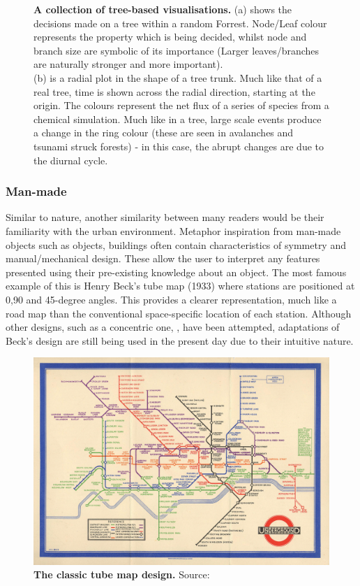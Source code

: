 \begin{figure}[H]
        \caption{\textbf{A collection of tree-based visualisations.}
         (a) shows the decisions made on a tree within a random Forrest. Node/Leaf colour represents the property which is being decided, whilst node and branch size are symbolic of its importance (Larger leaves/branches are naturally stronger and more important).\\
          (b) is a radial plot in the shape of a tree trunk. Much like that of a real tree, time is shown across the radial direction, starting at the origin. The colours represent the net flux of a series of species from a chemical simulation. Much like in a tree, large scale events produce a change in the ring colour (these are seen in avalanches and tsunami struck forests) - in this case, the abrupt changes are due to the diurnal cycle.}
        \label{fig:trees}
\end{figure}


\subsubsection{Man-made}
Similar to nature, another similarity between many readers would be their familiarity with the urban environment. Metaphor inspiration from man-made objects such as objects, buildings often contain characteristics of symmetry and manual/mechanical design. These allow the user to interpret any features presented using their pre-existing knowledge about an object. The most famous example of this is Henry Beck's tube map (1933) \citep{beck} where stations are positioned at 0,90 and 45-degree angles. This provides a clearer representation, much like a road map than the conventional space-specific location of each station. Although other designs, such as a concentric one, \citep{circ}, have been attempted, adaptations of Beck's design are still being used in the present day due to their intuitive nature.
%
%
%

\begin{figure}[H]
     \centering

         \includegraphics[width=.495\textwidth]{figures_c1/Beck_Map_1933.jpg}
         \vspace{5mm}

         \caption{\textbf{The classic tube map design.} Source: \citep{beck}}

         \label{fig:beck}

\end{figure}

